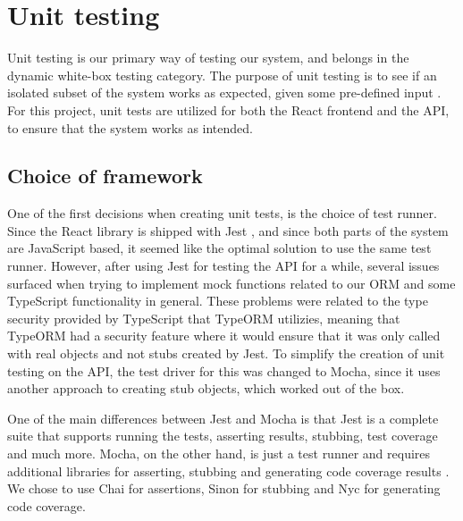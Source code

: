 \section{Unit testing}
Unit testing is our primary way of testing our system, and belongs in the dynamic white-box testing category.
The purpose of unit testing is to see if an isolated subset of the system works as expected, given some pre-defined input \cite{TestDrivenDevelopment}.
For this project, unit tests are utilized for both the React frontend and the API, to ensure that the system works as intended.

\subsection{Choice of framework}
One of the first decisions when creating unit tests, is the choice of test runner.
Since the React library is shipped with Jest \cite{ReactRunningTests}, and since both parts of the system are JavaScript based, it seemed like the optimal solution to use the same test runner.
However, after using Jest for testing the API for a while, several issues surfaced when trying to implement mock functions related to our ORM and some TypeScript functionality in general.
These problems were related to the type security provided by TypeScript that TypeORM utilizies, meaning that TypeORM had a security feature where it would ensure that it was only called with real objects and not stubs created by Jest.
To simplify the creation of unit testing on the API, the test driver for this was changed to Mocha, since it uses another approach to creating stub objects, which worked out of the box.

One of the main differences between Jest and Mocha is that Jest is a complete suite that supports running the tests, asserting results, stubbing, test coverage and much more.
Mocha, on the other hand, is just a test runner and requires additional libraries for asserting, stubbing and generating code coverage results \cite{Mocha}.
We chose to use Chai for assertions, Sinon for stubbing and Nyc for generating code coverage.

